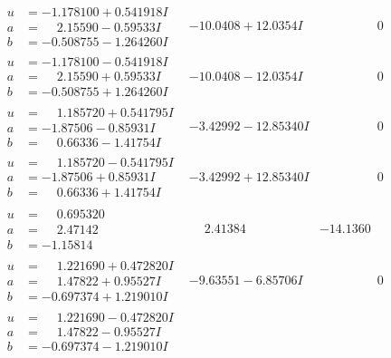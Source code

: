 \documentclass[1p]{elsarticle_modified}
\theoremstyle{definition}
\begin{document}
$$\begin{array}{c|c|c}
\begin{aligned}
u &= -1.178100 + 0.541918 I \\
a &= \phantom{-}2.15590 - 0.59533 I \\
b &= -0.508755 - 1.264260 I\end{aligned}
 & -10.0408 + 12.0354 I & \phantom{-0.000000 } 0 \\ \hline\begin{aligned}
u &= -1.178100 - 0.541918 I \\
a &= \phantom{-}2.15590 + 0.59533 I \\
b &= -0.508755 + 1.264260 I\end{aligned}
 & -10.0408 - 12.0354 I & \phantom{-0.000000 } 0 \\ \hline\begin{aligned}
u &= \phantom{-}1.185720 + 0.541795 I \\
a &= -1.87506 - 0.85931 I \\
b &= \phantom{-}0.66336 - 1.41754 I\end{aligned}
 & -3.42992 - 12.85340 I & \phantom{-0.000000 } 0 \\ \hline\begin{aligned}
u &= \phantom{-}1.185720 - 0.541795 I \\
a &= -1.87506 + 0.85931 I \\
b &= \phantom{-}0.66336 + 1.41754 I\end{aligned}
 & -3.42992 + 12.85340 I & \phantom{-0.000000 } 0 \\ \hline\begin{aligned}
u &= \phantom{-}0.695320\phantom{ +0.000000I} \\
a &= \phantom{-}2.47142\phantom{ +0.000000I} \\
b &= -1.15814\phantom{ +0.000000I}\end{aligned}
 & \phantom{-}2.41384\phantom{ +0.000000I} & -14.1360\phantom{ +0.000000I} \\ \hline\begin{aligned}
u &= \phantom{-}1.221690 + 0.472820 I \\
a &= \phantom{-}1.47822 + 0.95527 I \\
b &= -0.697374 + 1.219010 I\end{aligned}
 & -9.63551 - 6.85706 I & \phantom{-0.000000 } 0 \\ \hline\begin{aligned}
u &= \phantom{-}1.221690 - 0.472820 I \\
a &= \phantom{-}1.47822 - 0.95527 I \\
b &= -0.697374 - 1.219010 I\end{aligned}

\end{array}$$
\end{document}
